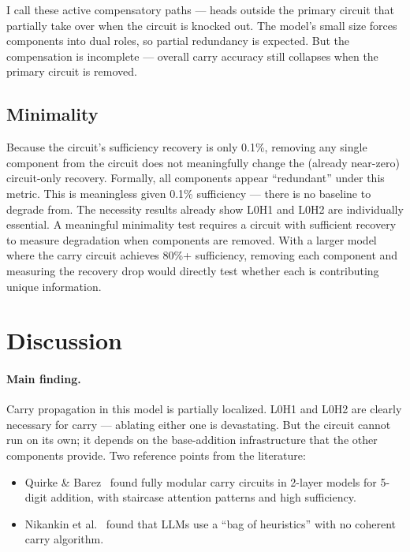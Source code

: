 \documentclass{article}
\begin{document}
I call these active compensatory paths --- heads outside the primary circuit that partially take over when the circuit is knocked out.
The model's small size forces components into dual roles, so partial redundancy is expected. But the compensation is incomplete --- overall carry accuracy still collapses when the primary circuit is removed.

\subsection{Minimality}

Because the circuit's sufficiency recovery is only 0.1\%, removing any single component from the circuit does not meaningfully change the (already near-zero) circuit-only recovery.
Formally, all components appear ``redundant'' under this metric.
This is meaningless given 0.1\% sufficiency --- there is no baseline to degrade from. The necessity results already show L0H1 and L0H2 are individually essential.
A meaningful minimality test requires a circuit with sufficient recovery to measure degradation when components are removed.
With a larger model where the carry circuit achieves 80\%+ sufficiency, removing each component and measuring the recovery drop would directly test whether each is contributing unique information.

\section{Discussion}
\label{sec:discussion}

\paragraph{Main finding.}
Carry propagation in this model is partially localized. L0H1 and L0H2 are clearly necessary for carry --- ablating either one is devastating. But the circuit cannot run on its own; it depends on the base-addition infrastructure that the other components provide.
Two reference points from the literature:

\begin{itemize}
\item Quirke \& Barez~\cite{quirke2024understanding} found fully modular carry circuits in 2-layer models for 5-digit addition, with staircase attention patterns and high sufficiency.
\item Nikankin et al.~\cite{nikankin2024arithmetic} found that LLMs use a ``bag of heuristics'' with no coherent carry algorithm.
\end{itemize}
\end{document}

